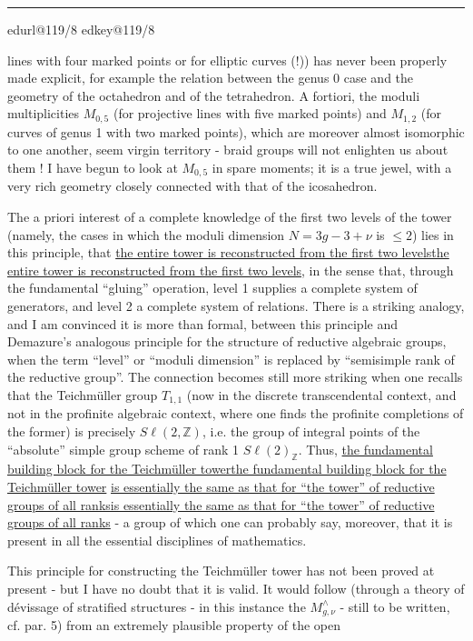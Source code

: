 \documentclass[11pt,a4paper]{article}
\makeatletter
\newif\ifreading
\newif\ifenglish
\def\CurrentScanURL{}
\def\CurrentPageKey{}
\def\CurrentApparatus{}
\newcommand{\scanpage}[1]{%
  \clearpage
  \expandafter\let\expandafter\CurrentScanURL\csname edurl@#1\endcsname
  \expandafter\let\expandafter\CurrentPageKey\csname edkey@#1\endcsname
  \def\CurrentApparatus{}%
  \hypertarget{scan-\CurrentPageKey}{}%
  \typeout{EDITION-SCAN: \CurrentPageKey; PDFPAGE: \the\numexpr\ReadonlyShipoutCounter+1\relax}%
  \ifreading
    \marginnote{\raggedright\scriptsize\sffamily\href{\CurrentScanURL}{119 / \csname edpage@#1\endcsname}}%
  \else
    \noindent{\small\sffamily\href{\CurrentScanURL}{[scan #1]}}\par\smallskip
  \fi}
\newcommand{\mspage}[1]{%
  \ifreading\marginnote{\raggedright\scriptsize\sffamily p.\,#1}[2\baselineskip]%
  \else\noindent{\small\sffamily[p.\,#1]}\par\smallskip\fi}
\let\TextUline\uline
\renewcommand{\uline}[1]{\ifmmode\underline{#1}\else\TextUline{#1}\fi}
\newcommand{\margin}[1]{%
  \sbox{\MarginalTestBox}{\parbox{\marginparwidth}{\raggedright\footnotesize#1}}%
  \ifdim\dimexpr\ht\MarginalTestBox+\dp\MarginalTestBox\relax>3\baselineskip
    \par\smallskip\noindent\begin{minipage}{\linewidth}\hrule\smallskip
    {\footnotesize\textcolor{HandInk}{\ifenglish Marginal note:\else Note marginale :\fi\ #1}}\smallskip\hrule\end{minipage}\par\smallskip
  \else
    \marginnote{\raggedright\footnotesize\textcolor{HandInk}{#1}}%
  \fi}
\newcommand{\finishscan}{\ifx\CurrentApparatus\empty\else\par\bigskip\noindent\rule{.35\linewidth}{.35pt}\par\smallskip{\footnotesize\setlength{\parskip}{3pt}\CurrentApparatus}\fi}
\makeatother
\begin{document}
\margin{7}

\finishscan
\scanpage{119/8}
\mspage{6}

lines with four marked points or for elliptic
curves (!)) has never been properly made explicit, for example the relation
between the genus 0 case and the geometry of the octahedron and of the
tetrahedron. A fortiori, the moduli multiplicities $M_{0,5}$ (for
projective lines with five marked points) and $M_{1,2}$ (for
curves of genus 1 with two marked points), which are moreover almost
isomorphic to one another, seem virgin territory - braid groups
will not enlighten us about them ! I have begun to
look at $M_{0,5}$ in spare moments; it is a true jewel, with a
very rich geometry closely connected with that of the icosahedron.

The a priori interest of a complete knowledge of the first two
levels of the tower (namely, the cases in which the moduli dimension
$N = 3g-3+\nu$ is $\leq 2$) lies in this principle, that \uline{the entire tower
is reconstructed from the first two levels}, in the sense that, through
the fundamental ``gluing'' operation, level 1 supplies a
complete system of generators, and level 2 a complete system of
relations. There is a striking analogy, and I am convinced it is
more than formal, between this principle and Demazure's analogous
principle for the structure of reductive algebraic groups, when
the term ``level'' or ``moduli dimension'' is replaced by ``semisimple
rank of the reductive group''. The connection becomes still more striking
when one recalls that the Teichmüller group $T_{1,1}$ (now in the
discrete transcendental context, and not in the profinite algebraic
context, where one finds the profinite completions of the former) is
precisely $S\ell(2,\mathbb{Z})$, i.e. the group of integral points of the
``absolute'' simple group scheme of rank 1 $S\ell(2)_{\mathbb{Z}}$. Thus, \uline{the fundamental
building block for the Teichmüller tower} \uline{is essentially
the same as that for ``the tower'' of reductive groups of all ranks} -
a group of which one can probably say, moreover, that it is present
in all the essential disciplines of mathematics.

This principle for constructing the Teichmüller tower has
not been proved at present - but I have no doubt that it
is valid. It would follow (through a theory of dévissage of stratified
structures - in this instance the $M^{\wedge}_{g,\nu}$ - still to be written,
cf. par. 5) from an extremely plausible property of the open
\end{document}
